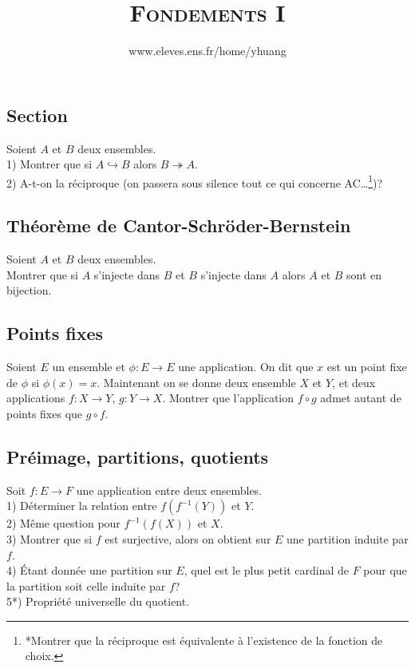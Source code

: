 \documentclass{article}
\begin{document}
\setcounter{section}{8}

\title{\textsc{Fondements I}}
\author{www.eleves.ens.fr/home/yhuang}
\date{}
\maketitle

\subsection{Section}
Soient $A$ et $B$ deux ensembles.\\
1) Montrer que si $A\hookrightarrow B$ alors $B\twoheadrightarrow A$.\\
2) A-t-on la r\'eciproque (on passera sous silence tout ce qui concerne AC\dots\footnote{
*Montrer que la r\'eciproque est \'equivalente \`a l'existence de la fonction de choix.})?

\subsection{Th\'eor\`eme de Cantor-Schr\"oder-Bernstein}
Soient $A$ et $B$ deux ensembles.\\
Montrer que si $A$ s'injecte dans $B$ et $B$ s'injecte dans $A$ alors $A$ et $B$ sont en bijection.

\subsection{Points fixes}
Soient $E$ un ensemble et $\phi:E\to E$ une application. On dit que $x$ est un point fixe de $\phi$ si $\phi(x)=x$. Maintenant on se donne deux ensemble $X$ et $Y$, et deux applications $f:X\to Y$, $g:Y\to X$. Montrer que l'application $f\circ g$ admet autant de points fixes que $g\circ f$.

\subsection{Pr\'eimage, partitions, quotients}
Soit $f:E\to F$ une application entre deux ensembles.\\
1) D\'eterminer la relation entre $f(f^{-1}(Y))$ et $Y$.\\
2) M\^eme question pour $f^{-1}(f(X))$ et $X$.\\
3) Montrer que si $f$ est surjective, alors on obtient sur $E$ une partition induite par $f$.\\
4) \'Etant donn\'ee une partition sur $E$, quel est le plus petit cardinal de $F$ pour que la partition soit celle induite par $f$?\\
5*) Propri\'et\'e universelle du quotient.
\end{document}
